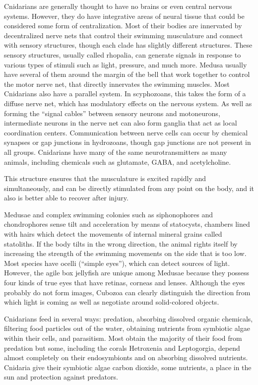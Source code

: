 Cnidarians are generally thought to have no brains or even central nervous systems. However, they do have integrative areas of neural tissue that could be considered some form of centralization. Most of their bodies are innervated by decentralized nerve nets that control their swimming musculature and connect with sensory structures, though each clade has slightly different structures. These sensory structures, usually called rhopalia, can generate signals in response to various types of stimuli such as light, pressure, and much more. Medusa usually have several of them around the margin of the bell that work together to control the motor nerve net, that directly innervates the swimming muscles. Most Cnidarians also have a parallel system. In scyphozoans, this takes the form of a diffuse nerve net, which has modulatory effects on the nervous system. As well as forming the ``signal cables'' between sensory neurons and motoneurons, intermediate neurons in the nerve net can also form ganglia that act as local coordination centers. Communication between nerve cells can occur by chemical synapses or gap junctions in hydrozoans, though gap junctions are not present in all groups. Cnidarians have many of the same neurotransmitters as many animals, including chemicals such as glutamate, GABA, and acetylcholine.

This structure ensures that the musculature is excited rapidly and simultaneously, and can be directly stimulated from any point on the body, and it also is better able to recover after injury.

Medusae and complex swimming colonies such as siphonophores and chondrophores sense tilt and acceleration by means of statocysts, chambers lined with hairs which detect the movements of internal mineral grains called statoliths. If the body tilts in the wrong direction, the animal rights itself by increasing the strength of the swimming movements on the side that is too low. Most species have ocelli (``simple eyes''), which can detect sources of light. However, the agile box jellyfish are unique among Medusae because they possess four kinds of true eyes that have retinas, corneas and lenses. Although the eyes probably do not form images, Cubozoa can clearly distinguish the direction from which light is coming as well as negotiate around solid-colored objects.

Cnidarians feed in several ways: predation, absorbing dissolved organic chemicals, filtering food particles out of the water, obtaining nutrients from symbiotic algae within their cells, and parasitism. Most obtain the majority of their food from predation but some, including the corals Hetroxenia and Leptogorgia, depend almost completely on their endosymbionts and on absorbing dissolved nutrients. Cnidaria give their symbiotic algae carbon dioxide, some nutrients, a place in the sun and protection against predators.

